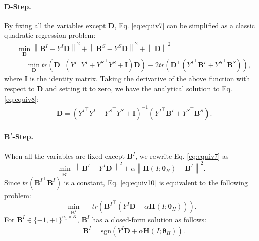 \documentclass[runningheads]{llncs}
\newcommand{\sgn}{{\mathrm{sgn}}}
\begin{document}
\paragraph{$\mathbf{D}$-Step.} By fixing all the variables except $\mathbf{D}$, Eq. \eqref{eq:equiv7} can be simplified as a classic quadratic regression problem:
\begin{equation}\label{eq:equiv8}
\begin{split}
&\min_{\mathbf{D}} \left \|  \mathbf{B}^I - Y^I\mathbf{D}\right \|^2 + \left \|  \mathbf{B}^S - Y^S\mathbf{D}\right \|^2 + \left \|  \mathbf{D}\right \|^2\\
&= \min_{\mathbf{D}} tr\left(\mathbf{D}^{\top} \left({Y^I}^{\top} Y^I+ {Y^S}^{\top} Y^S+\mathbf{I}\right)\mathbf{D}\right)- 2tr\left(\mathbf{D}^{\top} \left( {Y^I}^{\top} \mathbf{B}^I+{Y^S}^{\top}\mathbf{B}^S\right)\right),
\end{split}
\end{equation}
where $\mathbf{I}$ is the identity matrix. Taking the derivative of the above function with respect to $\mathbf{D}$ and setting it to zero, we have the analytical solution to Eq. \eqref{eq:equiv8}:
\begin{equation}\label{eq:equiv9}
\begin{split}
&\mathbf{D} = \left ({Y^I}^{\top} Y^I+ {Y^S}^{\top} Y^S+\mathbf{I}\right )^{-1}\left ({Y^I}^{\top} \mathbf{B}^I+{Y^S}^{\top}\mathbf{B}^S \right).
\end{split}
\end{equation}

\paragraph{$\mathbf{B}^I$-Step.} When all the variables are fixed except $\mathbf{B}^I$, we rewrite Eq. \eqref{eq:equiv7} as
\begin{equation}\label{eq:equiv10}
\min_{\mathbf{B}^I}\; \left \|  \mathbf{B}^I - {Y^I} \mathbf{D}\right \|^2 + \alpha\left \|  \mathbf{H}\left ( I ;\bm{\theta}_H\right ) -\mathbf{B}^I\right \|^2.
\end{equation}
Since $tr\left({\mathbf{B}^I}^{\top} \mathbf{B}^I\right)$ is a constant, Eq. \eqref{eq:equiv10} is equivalent to the following problem:
\begin{equation}\label{eq:equiv11}
\min_{\mathbf{B}^I}\; -tr\left (  {\mathbf{B}^I}^{\top}\left({Y^I} \mathbf{D}+\alpha\mathbf{H}\left ( I ;\bm{\theta}_H\right )\right)\right ).
\end{equation}
For $\mathbf{B}^I  \in\{-1,+1\}^{n_1 \times K} $, $\mathbf{B}^I$ has a closed-form solution as follows:
\begin{equation}\label{eq:equiv12}
\begin{split}
&\mathbf{B}^I = \sgn\left({Y^I}\mathbf{D}+\alpha\mathbf{H}\left( I ;\bm{\theta}_H\right )\right).
\end{split}
\end{equation}
\end{document}
